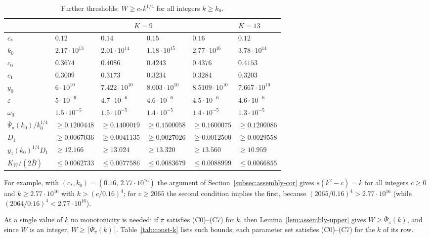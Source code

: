 \documentclass[11pt]{amsart}
\newcommand{\eps}{\varepsilon}
\theoremstyle{definition}
\theoremstyle{remark}
\numberwithin{equation}{section}
\begin{document}
\begin{table}[ht]
\centering
\caption{Further thresholds: $W\ge c_*k^{1/4}$ for all integers $k\ge k_0$.}\label{tab:const-pairs}
\small
\begin{tabular}{|l|l|l|l|l|l|}
\hline
 & \multicolumn{4}{c|}{$K=9$} & $K=13$\\
\hline
$c_*$ & $0.12$ & $0.14$ & $0.15$ & $0.16$ & $0.12$\\
$k_0$ & $2.17\cdot10^{13}$ & $2.01\cdot10^{14}$ & $1.18\cdot10^{15}$ & $2.77\cdot10^{16}$ & $3.78\cdot10^{14}$\\
\hline
$c_0$ & $0.3674$ & $0.4086$ & $0.4243$ & $0.4376$ & $0.4153$\\
$c_1$ & $0.3009$ & $0.3173$ & $0.3234$ & $0.3284$ & $0.3203$\\
$y_0$ & $6\cdot10^{10}$ & $7.422\cdot10^{10}$ & $8.003\cdot10^{10}$ & $8.5109\cdot10^{10}$ & $7.667\cdot10^{10}$\\
$\eps$ & $5\cdot10^{-6}$ & $4.7\cdot10^{-6}$ & $4.6\cdot10^{-6}$ & $4.5\cdot10^{-6}$ & $4.6\cdot10^{-6}$\\
$\omega_0$ & $1.5\cdot10^{-5}$ & $1.5\cdot10^{-5}$ & $1.4\cdot10^{-5}$ & $1.4\cdot10^{-5}$ & $1.3\cdot10^{-5}$\\
\hline
$\bar\Psi_\pi(k_0)/k_0^{1/4}$ & $\ge0.1200448$ & $\ge0.1400019$ & $\ge0.1500058$ & $\ge0.1600075$ & $\ge0.1200086$\\
$D_1$ & $\ge0.0067036$ & $\ge0.0041135$ & $\ge0.0027026$ & $\ge0.0012500$ & $\ge0.0029558$\\
$y_1(k_0)^{1/4}D_1$ & $\ge12.166$ & $\ge13.024$ & $\ge13.320$ & $\ge13.560$ & $\ge10.959$\\
$K_W/(2\bar B)$ & $\le0.0062733$ & $\le0.0077586$ & $\le0.0083679$ & $\le0.0088999$ & $\le0.0066855$\\
\hline
\end{tabular}
\end{table}

For example, with $(c_*,k_0)=(0.16,\,2.77\cdot10^{16})$ the argument of Section~\ref{subsec:assembly-cor} gives
$s(k^2-c)=k$ for all integers $c\ge0$ and $k\ge2.77\cdot10^{16}$ with $k>(c/0.16)^4$; for $c\ge2065$ the second
condition implies the first, because $(2065/0.16)^4>2.77\cdot10^{16}$ (while $(2064/0.16)^4<2.77\cdot10^{16}$).

At a single value of $k$ no monotonicity is needed: if $\pi$ satisfies (C0)--(C7) for $k$, then
Lemma~\ref{lem:assembly-upper} gives $W\ge\bar\Psi_\pi(k)$, and since $W$ is an integer, $W\ge\lceil\bar\Psi_\pi(k)\rceil$.
Table~\ref{tab:const-k} lists such bounds; each parameter set satisfies (C0)--(C7) for the $k$ of its row.
\end{document}
